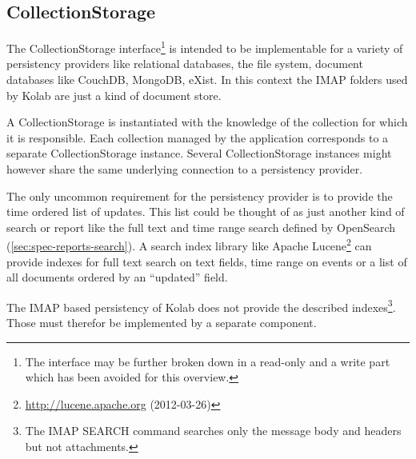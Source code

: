 \documentclass[11pt,a4paper,headsepline,twoside]{scrartcl}		%
\newcommand{\citeurl}[2]{\url{#1} (#2)}
\begin{document}


\subsection{CollectionStorage}
\label{sec:collectionstorage}

The CollectionStorage interface\footnote{The interface may be further broken
  down in a read-only and a write part which has been avoided for this
  overview.} is intended to be implementable for a variety of persistency
providers like relational databases, the file system, document databases like
CouchDB, MongoDB, eXist. In this context the IMAP folders used by Kolab are just
a kind of document store.

A CollectionStorage is instantiated with the knowledge of the collection for
which it is responsible. Each collection managed by the application corresponds
to a separate CollectionStorage instance. Several CollectionStorage instances
might however share the same underlying connection to a persistency provider.

The only uncommon requirement for the persistency provider is to provide the
time ordered list of updates. This list could be thought of as just another kind
of search or report like the full text and time range search defined by
OpenSearch (\autoref{sec:spec-reports-search}). A search index library like
Apache Lucene\footnote{\citeurl{http://lucene.apache.org}{2012-03-26}} can
provide indexes for full text search on text fields, time range on events or a
list of all documents ordered by an ``updated'' field.

The IMAP based persistency of Kolab does not provide the described
indexes\footnote{The IMAP SEARCH command\cite[sec 6.4.4]{RFC3501} searches only
  the message body and headers but not attachments.}. Those must therefor be
implemented by a separate component.
\end{document}
